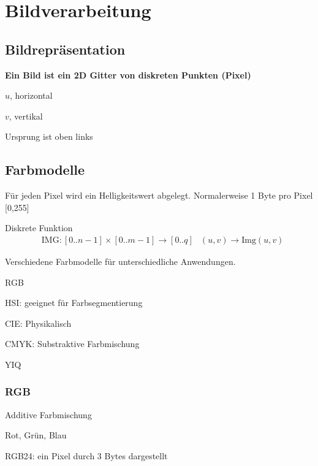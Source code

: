 \chapter{Bildverarbeitung}

\section{Bildrepräsentation}
\textbf{Ein Bild ist ein 2D Gitter von diskreten Punkten (Pixel)}

\begin{compactitem}
    \item $u$, horizontal
    \item $v$, vertikal
    \item Ursprung ist oben links
\end{compactitem}


\section{Farbmodelle}
Für jeden Pixel wird ein Helligkeitswert abgelegt. Normalerweise 1 Byte pro Pixel
[0,255]

Diskrete Funktion
\begin{align}
    &\text{IMG}:[0..n-1] \times [0..m-1] \rightarrow [0..q]
    &(u,v) \rightarrow \text{Img}(u,v)
\end{align}

Verschiedene Farbmodelle für unterschiedliche Anwendungen.
\begin{compactitem}
    \item RGB
    \item HSI: geeignet für Farbsegmentierung
    \item CIE: Physikalisch
    \item CMYK: Substraktive Farbmischung
    \item YIQ
\end{compactitem}

\subsection{RGB}
\begin{compactitem}
    \item Additive Farbmischung
    \item Rot, Grün, Blau
    \item RGB24: ein Pixel durch 3 Bytes dargestellt
\end{compactitem}
